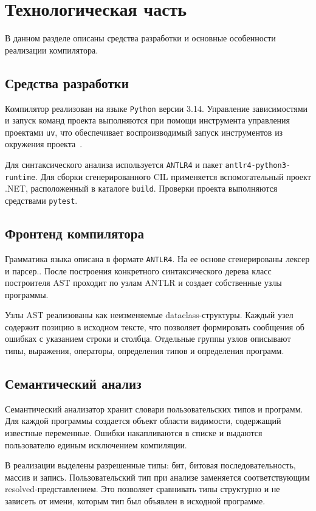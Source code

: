 \chapter{Технологическая часть}

В данном разделе описаны средства разработки и основные особенности реализации компилятора.

\section{Средства разработки}
Компилятор реализован на языке \texttt{Python} версии 3.14.
Управление зависимостями и запуск команд проекта выполняются при помощи инструмента управления проектами \texttt{uv}, что обеспечивает воспроизводимый запуск инструментов из окружения проекта~\cite{python,uv}.

Для синтаксического анализа используется \texttt{ANTLR4} и пакет \texttt{antlr4-python3-runtime}.
Для сборки сгенерированного CIL применяется вспомогательный проект .NET, расположенный в каталоге \texttt{build}.
Проверки проекта выполняются средствами \texttt{pytest}.

\section{Фронтенд компилятора}
Грамматика языка описана в формате \texttt{ANTLR4}.
На ее основе сгенерированы лексер и парсер..
После построения конкретного синтаксического дерева класс построителя AST проходит по узлам ANTLR и создает собственные узлы программы.

Узлы AST реализованы как неизменяемые dataclass-структуры.
Каждый узел содержит позицию в исходном тексте, что позволяет формировать сообщения об ошибках с указанием строки и столбца.
Отдельные группы узлов описывают типы, выражения, операторы, определения типов и определения программ.

\section{Семантический анализ}
Семантический анализатор хранит словари пользовательских типов и программ.
Для каждой программы создается объект области видимости, содержащий известные переменные.
Ошибки накапливаются в списке и выдаются пользователю единым исключением компиляции.

В реализации выделены разрешенные типы: бит, битовая последовательность, массив и запись.
Пользовательский тип при анализе заменяется соответствующим resolved-представлением.
Это позволяет сравнивать типы структурно и не зависеть от имени, которым тип был объявлен в исходной программе.


